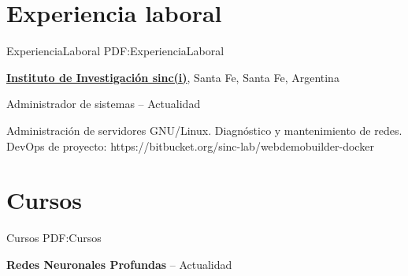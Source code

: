 \documentclass[letterpaper,MMMyyyy,nonstop]{simpleresumecv}
\begin{document}
\begin{body}

%
%


\section
{Experiencia\newline
laboral}
{ExperienciaLaboral}
{PDF:ExperienciaLaboral}

\href{http://www.sinc.unl.edu.ar}
{\textbf{Instituto de Investigación sinc(i)}},
Santa Fe, Santa Fe, Argentina

\GapNoBreak
\BulletItem
Administrador de sistemas
\hfill
{} --
Actualidad
\begin{detail}
\SubBulletItem
Administración de servidores GNU/Linux.
\SubBulletItem
Diagnóstico y mantenimiento de redes.
\SubBulletItem
DevOps de proyecto: https://bitbucket.org/sinc-lab/webdemobuilder-docker
\end{detail}


\section
{Cursos}
{Cursos}
{PDF:Cursos}

\textbf{Redes Neuronales Profundas}
\hfill
{} --
Actualidad


\end{body}
\end{document}
